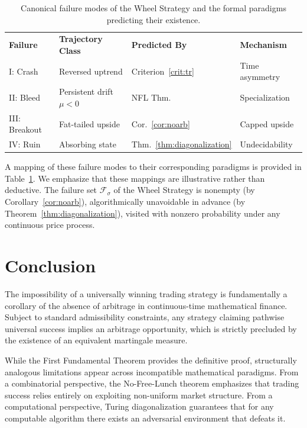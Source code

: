 \documentclass[aps,pra,reprint,superscriptaddress,amsmath,amssymb]{revtex4-2}
\theoremstyle{plain}
\theoremstyle{definition}
\theoremstyle{remark}
\begin{document}
\begin{table}[ht]
\caption{\label{tab:failuremodes}Canonical failure modes of the Wheel Strategy and the formal paradigms predicting their existence.}
\begin{ruledtabular}
\begin{tabular}{llll}
\textbf{Failure} & \textbf{Trajectory Class} & \textbf{Predicted By} & \textbf{Mechanism} \\
\colrule
I: Crash & Reversed uptrend & Criterion~\ref{crit:tr} & Time asymmetry \\
II: Bleed & Persistent drift $\mu<0$ & NFL Thm. & Specialization \\
III: Breakout & Fat-tailed upside & Cor.~\ref{cor:noarb} & Capped upside \\
IV: Ruin & Absorbing state & Thm.~\ref{thm:diagonalization} & Undecidability \\
\end{tabular}
\end{ruledtabular}
\end{table}

A mapping of these failure modes to their corresponding paradigms is provided in Table~\ref{tab:failuremodes}. We emphasize that these mappings are illustrative rather than deductive. The failure set $\mathcal{F}_\sigma$ of the Wheel Strategy is nonempty (by Corollary~\ref{cor:noarb}), algorithmically unavoidable in advance (by Theorem~\ref{thm:diagonalization}),
visited with nonzero probability under any continuous price process.

\section{Conclusion}
\label{sec:conclusion}

The impossibility of a universally winning trading strategy is fundamentally a corollary of the absence of arbitrage in continuous-time mathematical finance. Subject to standard admissibility constraints, any strategy claiming pathwise universal success implies an arbitrage opportunity, which is strictly precluded by the existence of an equivalent martingale measure.

While the First Fundamental Theorem provides the definitive proof, structurally analogous limitations appear across incompatible mathematical paradigms. From a combinatorial perspective, the No-Free-Lunch theorem emphasizes that trading success relies entirely on exploiting non-uniform market structure. From a computational perspective, Turing diagonalization guarantees that for any computable algorithm there exists an adversarial environment that defeats it.
\end{document}
